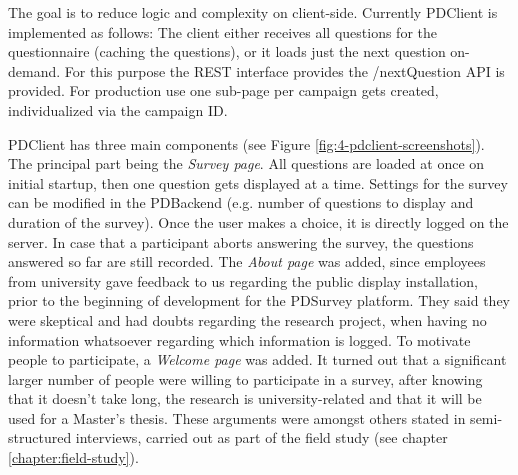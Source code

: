 		The goal is to reduce logic and complexity on client-side. Currently PDClient is implemented as follows: The client either receives all questions for the questionnaire (caching the questions), or it loads just the next question on-demand. For this purpose the REST interface provides the /nextQuestion API is provided. For production use one sub-page per campaign gets created, individualized via the campaign ID.
		

		PDClient has three main components (see Figure \ref{fig:4-pdclient-screenshots}). The principal part being the \textit{Survey page}. All questions are loaded at once on initial startup, then one question gets displayed at a time. Settings for the survey can be modified in the PDBackend (e.g. number of questions to display and duration of the survey). Once the user makes a choice, it is directly logged on the server. In case that a participant aborts answering the survey, the questions answered so far are still recorded. The \textit{About page} was added, since employees from university gave feedback to us regarding the public display installation, prior to the beginning of development for the PDSurvey platform. They said they were skeptical and had doubts regarding the research project, when having no information whatsoever regarding which information is logged. To motivate people to participate, a \textit{Welcome page} was added. It turned out that a significant larger number of people were willing to participate in a survey, after knowing that it doesn't take long, the research is university-related and that it will be used for a Master's thesis. These arguments were amongst others stated in semi-structured interviews, carried out as part of the field study (see chapter \ref{chapter:field-study}).





